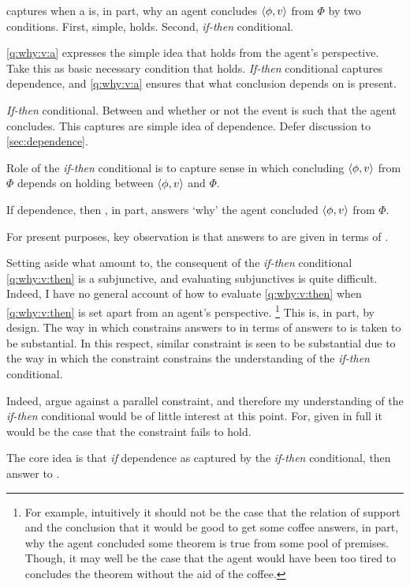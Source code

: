 \begin{note}
  \qWhyVnP{} captures when a \ros{} is, in part, why an agent concludes \(\langle \phi, v \rangle\) from \(\Phi\) by two conditions.
  First, simple, \ros{} holds.
  Second, \emph{if-then} conditional.

  \ref{q:why:v:a} expresses the simple idea that \support{} holds from the agent's perspective.
  Take this as basic necessary condition that \support{} holds.
  \emph{If-then} conditional captures dependence, and \ref{q:why:v:a} ensures that what conclusion depends on is present.

  \emph{If-then} conditional.
  Between \support{} and whether or not the event is such that the agent concludes.
  This captures are simple idea of dependence.
  Defer discussion to \autoref{sec:dependence}.

  Role of the \emph{if-then} conditional is to capture sense in which concluding \(\langle \phi, v \rangle\) from \(\Phi\) depends on \ros{} holding between \(\langle \phi, v \rangle\) and \(\Phi\).

  If dependence, then \ros{}, in part, answers `why' the agent concluded \(\langle \phi, v \rangle\) from \(\Phi\).

  For present purposes, key observation is that answers to \qWhyVnP{} are given in terms of .

  Setting aside what  amount to, the consequent of the \emph{if-then} conditional \ref{q:why:v:then} is a subjunctive, and evaluating subjunctives is quite difficult.
  Indeed, I have no general account of how to evaluate \ref{q:why:v:then} when \ref{q:why:v:then} is set apart from an agent's perspective.%
  \footnote{
    For example, intuitively it should not be the case that the relation of support and the conclusion that it would be good to get some coffee answers, in part, why the agent concluded some theorem is true from some pool of premises.
    Though, it may well be the case that the agent would have been too tired to concludes the theorem without the aid of the coffee.
  }
  This is, in part, by design.
  The way in which \issueInclusion{} constrains answers to \qWhy{} in terms of answers to \qHow{} is taken to be substantial.
  In this respect, similar constraint is seen to be substantial due to the way in which the constraint constrains the understanding of the \emph{if-then} conditional.

  Indeed, argue against a parallel constraint, and therefore my understanding of the \emph{if-then} conditional would be of little interest at this point.
  For, given in full it would be the case that the constraint fails to hold.

  The core idea is that \emph{if} dependence as captured by the \emph{if-then} conditional, then answer to \qWhy{}.
\end{note}

